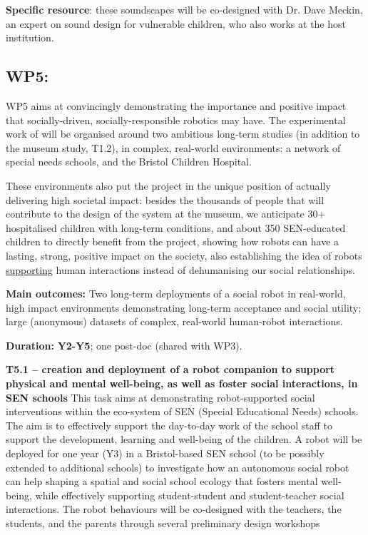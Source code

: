\textbf{Specific resource}: these soundscapes will be co-designed with Dr.
Dave Meckin, an expert on sound design for vulnerable children, who also works
at the host institution.

\subsection{WP5: \textbf{\wpFive}}


WP5 aims at convincingly demonstrating the importance and positive impact that
socially-driven, socially-responsible robotics may have. The experimental work
of \project will be organised around two ambitious long-term studies (in
addition to the museum study, T1.2), in complex, real-world environments: a
network of special needs schools, and the Bristol Children Hospital.

These environments also put the project in the unique position of actually
delivering high societal impact: besides the thousands of people that will
contribute to the design of the system at the museum, we anticipate 30+
hospitalised children with long-term conditions, and about 350 SEN-educated children to directly benefit from the project, showing how
robots can have a lasting, strong, positive impact on the society, also
establishing the idea of robots \ul{supporting} human interactions instead of
dehumanising our social relationships.

\begin{framed}

    \textbf{Main outcomes:} Two long-term deployments of a social robot in
    real-world, high impact environments demonstrating long-term acceptance and
    social utility; large (anonymous) datasets of complex, real-world
    human-robot interactions.

    \textbf{Duration:} \textbf{Y2-Y5}; one post-doc (shared with WP3).

\end{framed}
\textbf{T5.1 -- creation and deployment of a robot companion to
support physical and mental well-being, as well as foster social interactions,
in SEN schools} This task aims at demonstrating robot-supported social
interventions within the eco-system of SEN (Special Educational Needs)
schools. The aim is to effectively support the day-to-day work of the
school staff to support the development, learning and well-being of the
children. A \project robot will be deployed for one year (Y3) in a
Bristol-based SEN school (to be possibly extended to additional schools) to
investigate how an autonomous social robot can help shaping a spatial and social
school ecology that fosters mental well-being, while effectively supporting
student-student and student-teacher social interactions. The
robot behaviours will be co-designed with the teachers, the students, and the
parents through several preliminary design workshops

